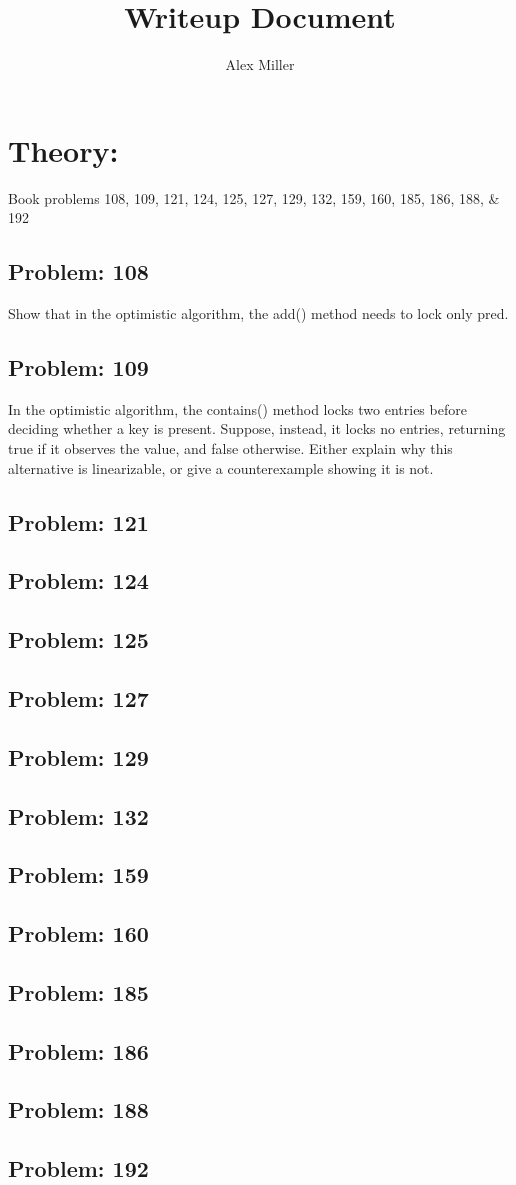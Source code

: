\documentclass[]{article}
\title{Writeup Document}
\author{Alex Miller}
\begin{document}
\section{Theory:}
Book problems 108, 109, 121, 124, 125, 127, 129, 132, 159, 160, 185, 186, 188, \& 192

\subsection{Problem: 108}
Show that in the optimistic algorithm, the add() method needs to
lock only pred.
\subsection{Problem: 109}
In the optimistic algorithm, the contains() method locks two
entries before deciding whether a key is present. Suppose, instead, it locks no
entries, returning true if it observes the value, and false otherwise.
Either explain why this alternative is linearizable, or give a counterexample
showing it is not.
\subsection{Problem: 121}
\subsection{Problem: 124}
\subsection{Problem: 125}
\subsection{Problem: 127}
\subsection{Problem: 129}
\subsection{Problem: 132}
\subsection{Problem: 159}
\subsection{Problem: 160}
\subsection{Problem: 185}
\subsection{Problem: 186}
\subsection{Problem: 188}
\subsection{Problem: 192}
	
\maketitle
\end{document}
